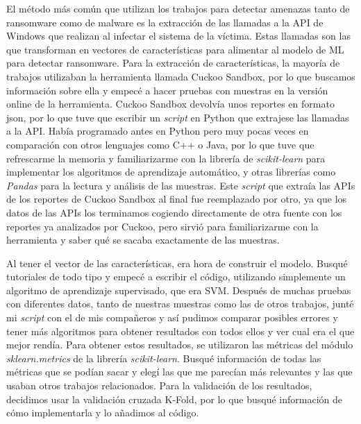 El método más común que utilizan los trabajos para detectar amenazas tanto de ransomware como de malware es la extracción de las llamadas a la \gls{API} de Windows que realizan al infectar el sistema de la víctima. Estas llamadas son las que transforman en vectores de características para alimentar al modelo de \gls{ML} para detectar ransomware. Para la extracción de características, la mayoría de trabajos utilizaban la herramienta llamada Cuckoo Sandbox, por lo que buscamos información sobre ella y empecé a hacer pruebas con muestras en la versión online de la herramienta. Cuckoo Sandbox devolvía unos reportes en formato json, por lo que tuve que escribir un \textit{script} en Python que extrajese las llamadas a la \gls{API}. Había programado antes en Python pero muy pocas veces en comparación con otros lenguajes como C++ o Java, por lo que tuve que refrescarme la memoria y familiarizarme con la librería de \textit{scikit-learn} para implementar los algoritmos de aprendizaje automático, y otras librerías como \textit{Pandas} para la lectura y análisis de las muestras. Este \textit{script} que extraía las \gls{API}s de los reportes de Cuckoo Sandbox al final fue reemplazado por otro, ya que los datos de las \gls{API}s los terminamos cogiendo directamente de otra fuente con los reportes ya analizados por Cuckoo, pero sirvió para familiarizarme con la herramienta y saber qué se sacaba exactamente de las muestras.

Al tener el vector de las características, era hora de construir el modelo. Busqué tutoriales de todo tipo y empecé a escribir el código, utilizando simplemente un algoritmo de aprendizaje supervisado, que era \gls{SVM}. Después de muchas pruebas con diferentes datos, tanto de nuestras muestras como las de otros trabajos, junté mi \textit{script} con el de mis compañeros y así pudimos comparar posibles errores y tener más algoritmos para obtener resultados con todos ellos y ver cual era el que mejor rendía. Para obtener estos resultados, se utilizaron las métricas del módulo \textit{sklearn.metrics} de la librería \textit{scikit-learn}. Busqué información de todas las métricas que se podían sacar y elegí las que me parecían más relevantes y las que usaban otros trabajos relacionados. Para la validación de los resultados, decidimos usar la validación cruzada K-Fold, por lo que busqué información de cómo implementarla y lo añadimos al código.

